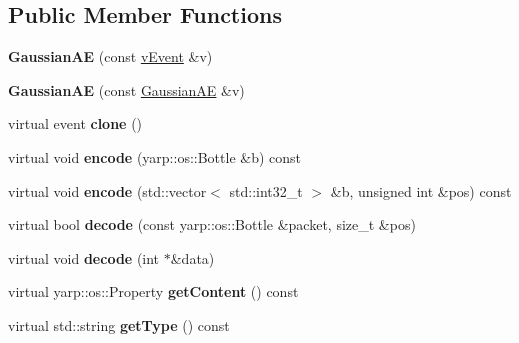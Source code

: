 \subsection*{Public Member Functions}
\begin{DoxyCompactItemize}
\item 
{\bfseries Gaussian\+AE} (const \hyperlink{classev_1_1vEvent}{v\+Event} \&v)\hypertarget{classev_1_1GaussianAE_abc9c34d68ad44ea743b565a6206e591f}{}\label{classev_1_1GaussianAE_abc9c34d68ad44ea743b565a6206e591f}

\item 
{\bfseries Gaussian\+AE} (const \hyperlink{classev_1_1GaussianAE}{Gaussian\+AE} \&v)\hypertarget{classev_1_1GaussianAE_ac5934905f00cc08eb9c444f67e0ec6a2}{}\label{classev_1_1GaussianAE_ac5934905f00cc08eb9c444f67e0ec6a2}

\item 
virtual event {\bfseries clone} ()\hypertarget{classev_1_1GaussianAE_aa9e649d9039d3e9348cea99352df77c5}{}\label{classev_1_1GaussianAE_aa9e649d9039d3e9348cea99352df77c5}

\item 
virtual void {\bfseries encode} (yarp\+::os\+::\+Bottle \&b) const \hypertarget{classev_1_1GaussianAE_a305a85a18095be68f6ccef59bc1ee9a7}{}\label{classev_1_1GaussianAE_a305a85a18095be68f6ccef59bc1ee9a7}

\item 
virtual void {\bfseries encode} (std\+::vector$<$ std\+::int32\+\_\+t $>$ \&b, unsigned int \&pos) const \hypertarget{classev_1_1GaussianAE_a33bbbb9f9e33b264256df9374c74f52f}{}\label{classev_1_1GaussianAE_a33bbbb9f9e33b264256df9374c74f52f}

\item 
virtual bool {\bfseries decode} (const yarp\+::os\+::\+Bottle \&packet, size\+\_\+t \&pos)\hypertarget{classev_1_1GaussianAE_a508515e443b7c3c5ffd1f3fd02ced00a}{}\label{classev_1_1GaussianAE_a508515e443b7c3c5ffd1f3fd02ced00a}

\item 
virtual void {\bfseries decode} (int $\ast$\&data)\hypertarget{classev_1_1GaussianAE_a4fad0182983dee207a9efdbdb3bde506}{}\label{classev_1_1GaussianAE_a4fad0182983dee207a9efdbdb3bde506}

\item 
virtual yarp\+::os\+::\+Property {\bfseries get\+Content} () const \hypertarget{classev_1_1GaussianAE_a986a28cb312c870c8e7fc1bc178a8a5a}{}\label{classev_1_1GaussianAE_a986a28cb312c870c8e7fc1bc178a8a5a}

\item 
virtual std\+::string {\bfseries get\+Type} () const \hypertarget{classev_1_1GaussianAE_a902ce886c1c5a2af42e073c3c7992bd5}{}\label{classev_1_1GaussianAE_a902ce886c1c5a2af42e073c3c7992bd5}

\end{DoxyCompactItemize}
